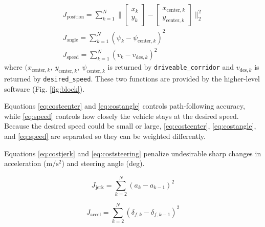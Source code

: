 \documentclass[letterpaper, 10 pt, conference]{ieeeconf}  %
\begin{document}
 \begin{gather}
 J_{\text{position}} = \sum_{k=1}^N\big\| \begin{bmatrix}
 x_k\\y_k
 \end{bmatrix} - \begin{bmatrix}
 x_{\text{center},k}\\y_{\text{center},k}
 \end{bmatrix} \big\|_2^2
  \label{eq:costcenter}
 \\
 J_{\text{angle}} = \sum_{k=1}^N (\psi_k - \psi_{\text{center},k})^2
 \label{eq:costangle}
 \\
  J_{\text{speed}} = \sum_{k=1}^N (v_k - v_{\text{des},k})^2
 \label{eq:speed}
 \end{gather}
 where $(x_{\text{center},k},\ y_{\text{center},k},\ \psi_{\text{center},k}$ is returned by \texttt{driveable\_corridor} and $v_{\text{des},k}$ is returned by \texttt{desired\_speed}. These two functions are provided by the higher-level software (Fig. \ref{fig:block}).
 
 
 
 Equations \eqref{eq:costcenter} and \eqref{eq:costangle} controls path-following accuracy, while \eqref{eq:speed} controls how closely the vehicle stays at the desired speed. Because the desired speed could be small or large, \eqref{eq:costcenter}, \eqref{eq:costangle}, and \eqref{eq:speed} are separated so they can be weighted differently.
 
 
 Equations \eqref{eq:costjerk} and \eqref{eq:coststeering} penalize undesirable sharp changes in acceleration ($\text{m}/\text{s}^2$) and steering angle (deg).
 
 \begin{equation}
 J_{\text{jerk}} = \sum_{k=2}^N (a_k - a_{k-1})^2
 \label{eq:costjerk}
 \end{equation}
 
 \begin{equation}
 J_{\text{accel}} = \sum_{k=2}^N (\delta_{f,k} - \delta_{f,k-1})^2
 \label{eq:coststeering}
 \end{equation}
 
\end{document}
